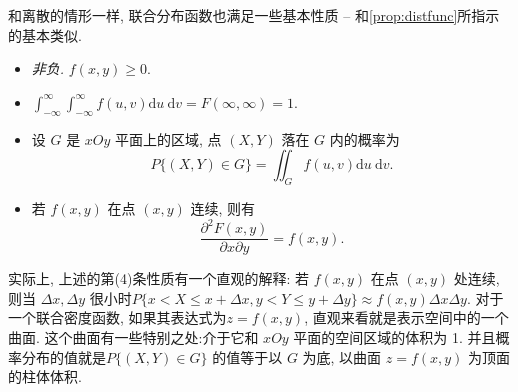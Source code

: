   和离散的情形一样, 联合分布函数也满足一些基本性质 -- 和\cref{prop:distfunc}所指示的基本类似. 
    \begin{itemize}
      \item \emph{非负.}  $f(x, y) \geqslant 0$.
      \item $\int_{-\infty}^{\infty} \int_{-\infty}^{\infty} f(u, v) \mathrm{d} u \mathrm{~d} v=F(\infty, \infty)=1$.
      \item 设 $G$ 是 $x O y$ 平面上的区域, 点 $(X, Y)$ 落在 $G$ 内的概率为
      $$
          P\{(X, Y) \in G\}=\iint_G f(u, v) \mathrm{d} u \mathrm{~d} v .
      $$
      \item 若 $f(x, y)$ 在点 $(x, y)$ 连续, 则有
      $$
          \frac{\partial^2 F(x, y)}{\partial x \partial y}=f(x, y) .
      $$
    \end{itemize}

    实际上, 上述的第(4)条性质有一个直观的解释: 若 $f(x, y)$ 在点 $(x, y)$ 处连续, 则当 $\Delta x, \Delta y$ 很小时$P\{x<X \leqslant x+\Delta x, y<Y \leqslant y+\Delta y\} \approx f(x, y) \Delta x \Delta y$. 对于一个联合密度函数, 如果其表达式为$z=f(x, y)$, 直观来看就是表示空间中的一个曲面. 这个曲面有一些特别之处:介于它和 $x O y$ 平面的空间区域的体积为 1. 并且概率分布的值就是$P\{(X, Y) \in G\}$ 的值等于以 $G$ 为底, 以曲面 $z=f(x, y)$ 为顶面的柱体体积.

